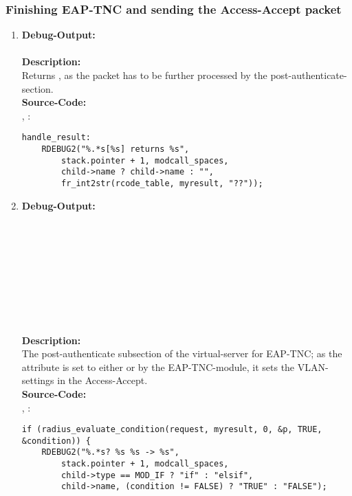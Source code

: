 \subsubsection*{Finishing EAP-TNC and sending the Access-Accept packet}
\label{section:finishing_eap_tnc_and_sending_the_access_accept_packet}
\begin{enumerate}
\item \textbf{Debug-Output:}\\
\\
\newline
\textbf{Description:}\\
Returns , as the packet has to be further processed by the post-authenticate-section.\\
\newline
\textbf{Source-Code:}\\
, :
\begin{lstlisting}
handle_result:
	RDEBUG2("%.*s[%s] returns %s",
		stack.pointer + 1, modcall_spaces,
		child->name ? child->name : "",
		fr_int2str(rcode_table, myresult, "??"));
\end{lstlisting}

\item \textbf{Debug-Output:}\\
\\
\\
\\
\\
\\
\\
\\
\\
\\
\newline
\textbf{Description:}\\
The post-authenticate subsection of the virtual-server for EAP-TNC; as the attribute  is set to either  or  by the EAP-TNC-module, it sets the VLAN-settings in the Access-Accept.\\
\newline
\textbf{Source-Code:}\\
, :
\begin{lstlisting}
if (radius_evaluate_condition(request, myresult, 0, &p, TRUE, &condition)) {
	RDEBUG2("%.*s? %s %s -> %s",
		stack.pointer + 1, modcall_spaces,
		child->type == MOD_IF ? "if" : "elsif",
		child->name, (condition != FALSE) ? "TRUE" : "FALSE");
\end{lstlisting}


\end{enumerate}
